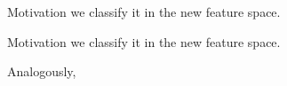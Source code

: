 \begin{frame} {Motivation}
   \small{we classify it in the new feature space.}
  \begin{figure}
    \centering
  \end{figure}
\end{frame}

\begin{frame} {Motivation}
   \small{we classify it in the new feature space.}
  \begin{figure}
    \centering
  \end{figure}
  \small{Analogously, }
  \begin{figure}
    \centering
  \end{figure}
\end{frame}

